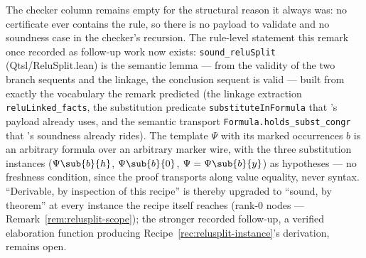 \begin{bremark}
\label{rem:relusplit-mech}
The checker column remains empty for the structural reason it always
was: no certificate ever contains the rule, so there is no payload to
validate and no soundness case in the checker's recursion. The
rule-level statement this remark once recorded as follow-up work now
exists: \texttt{sound\_reluSplit} (Qtsl/ReluSplit.lean) is
the semantic lemma --- from the validity of the two branch sequents
and the linkage, the conclusion sequent is valid --- built from
exactly the vocabulary the remark predicted (the linkage extraction
\texttt{reluLinked\_facts}, the substitution predicate
\texttt{substituteInFormula} that 's payload already
uses, and the semantic transport \texttt{Formula.holds\_subst\_congr}
that 's soundness already rides). The template
$\Psi$ with its marked occurrences $b$ is an arbitrary formula over an
arbitrary marker wire, with the three substitution instances
($\Psi\sub{b}{h}$, $\Psi\sub{b}{0}$, $\Psi = \Psi\sub{b}{y}$) as
hypotheses --- no freshness condition, since the proof transports
along value equality, never syntax. ``Derivable, by inspection of
this recipe'' is thereby upgraded to ``sound, by theorem'' at every
instance the recipe itself reaches (rank-$0$ nodes ---
Remark~\ref{rem:relusplit-scope}); the stronger recorded follow-up, a
verified elaboration function producing
Recipe~\ref{rec:relusplit-instance}'s derivation, remains open.
\end{bremark}

